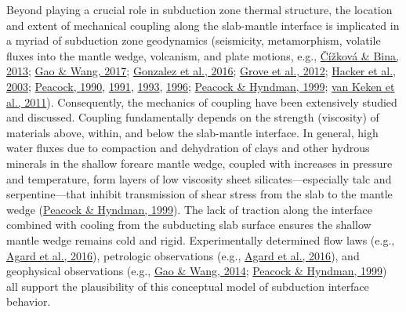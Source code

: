 \documentclass[draft,linenumbers]{agujournal2018}
\begin{document}
Beyond playing a crucial role in subduction zone thermal structure, the
location and extent of mechanical coupling along the slab-mantle
interface is implicated in a myriad of subduction zone geodynamics
(seismicity, metamorphism, volatile fluxes into the mantle wedge,
volcanism, and plate motions, e.g.,
\protect\hyperlink{ref-Cizkova2013}{Čížková \& Bina, 2013};
\protect\hyperlink{ref-Gao2017}{Gao \& Wang, 2017};
\protect\hyperlink{ref-Gonzalez2016}{Gonzalez et al., 2016};
\protect\hyperlink{ref-Grove2012}{Grove et al., 2012};
\protect\hyperlink{ref-Hacker2003}{Hacker et al., 2003};
\protect\hyperlink{ref-Peacock1990}{Peacock, 1990},
\protect\hyperlink{ref-Peacock1991}{1991},
\protect\hyperlink{ref-Peacock1993}{1993},
\protect\hyperlink{ref-Peacock1996}{1996};
\protect\hyperlink{ref-Peacock1999a}{Peacock \& Hyndman, 1999};
\protect\hyperlink{ref-VanKeken2011}{van Keken et al., 2011}).
Consequently, the mechanics of coupling have been extensively studied
and discussed. Coupling fundamentally depends on the strength
(viscosity) of materials above, within, and below the slab-mantle
interface. In general, high water fluxes due to compaction and
dehydration of clays and other hydrous minerals in the shallow forearc
mantle wedge, coupled with increases in pressure and temperature, form
layers of low viscosity sheet silicates---especially talc and
serpentine---that inhibit transmission of shear stress from the slab to
the mantle wedge (\protect\hyperlink{ref-Peacock1999a}{Peacock \&
Hyndman, 1999}). The lack of traction along the interface combined with
cooling from the subducting slab surface ensures the shallow mantle
wedge remains cold and rigid. Experimentally determined flow laws (e.g.,
\protect\hyperlink{ref-Agard2016}{Agard et al., 2016}), petrologic
observations (e.g., \protect\hyperlink{ref-Agard2016}{Agard et al.,
2016}), and geophysical observations (e.g.,
\protect\hyperlink{ref-Gao2014}{Gao \& Wang, 2014};
\protect\hyperlink{ref-Peacock1999a}{Peacock \& Hyndman, 1999}) all
support the plausibility of this conceptual model of subduction
interface behavior.
\end{document}

